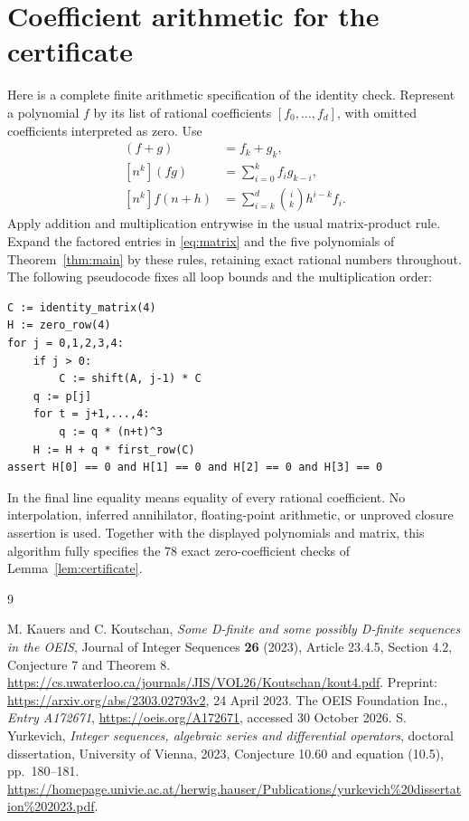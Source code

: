 \documentclass[11pt]{article}
\begin{document}
\section{Coefficient arithmetic for the certificate}\label{app:algorithm}
Here is a complete finite arithmetic specification of the identity check.
Represent a polynomial $f$ by its list of rational coefficients
$[f_0,\ldots,f_d]$, with omitted coefficients interpreted as zero.
Use
\begin{align*}
 [n^k](f+g)&=f_k+g_k,\\
 [n^k](fg)&=\sum_{i=0}^{k}f_i g_{k-i},\\
 [n^k]f(n+h)&=\sum_{i=k}^{d}\binom{i}{k}h^{i-k}f_i.
\end{align*}
Apply addition and multiplication entrywise in the usual matrix-product
rule. Expand the factored entries in \eqref{eq:matrix} and the five
polynomials of Theorem~\ref{thm:main} by these rules, retaining exact
rational numbers throughout. The following pseudocode fixes all loop
bounds and the multiplication order:
\begin{lstlisting}
C := identity_matrix(4)
H := zero_row(4)
for j = 0,1,2,3,4:
    if j > 0:
        C := shift(A, j-1) * C
    q := p[j]
    for t = j+1,...,4:
        q := q * (n+t)^3
    H := H + q * first_row(C)
assert H[0] == 0 and H[1] == 0 and H[2] == 0 and H[3] == 0
\end{lstlisting}
In the final line equality means equality of every rational coefficient.
No interpolation, inferred annihilator, floating-point arithmetic, or
unproved closure assertion is used. Together with the displayed
polynomials and matrix, this algorithm fully specifies the 78 exact
zero-coefficient checks of Lemma~\ref{lem:certificate}.

\clearpage
\begin{thebibliography}{9}
\raggedright
{} M. Kauers and C. Koutschan,
\emph{Some D-finite and some possibly D-finite sequences in the OEIS},
Journal of Integer Sequences \textbf{26} (2023), Article 23.4.5,
Section 4.2, Conjecture 7 and Theorem 8.
\url{https://cs.uwaterloo.ca/journals/JIS/VOL26/Koutschan/kout4.pdf}.
Preprint: \url{https://arxiv.org/abs/2303.02793v2}, 24 April 2023.
 The OEIS Foundation Inc., \emph{Entry A172671},
\url{https://oeis.org/A172671}, accessed 30 October 2026.
 S. Yurkevich, \emph{Integer sequences, algebraic series and differential operators},
doctoral dissertation, University of Vienna, 2023,
Conjecture 10.60 and equation (10.5), pp.~180--181.
\url{https://homepage.univie.ac.at/herwig.hauser/Publications/yurkevich%20dissertation%202023.pdf}.
\end{thebibliography}
\end{document}
